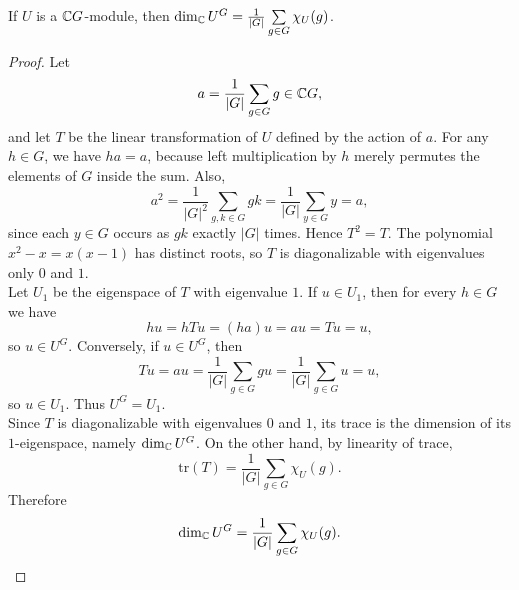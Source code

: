 \documentclass[../Odyssey_Project.tex]{subfiles}
\begin{document}
\begin{lemma}
\label{lem:14.11}
If $U$ is a $\mathbb{C} G$-module, then $\dim_{\mathbb{C}} U^G = \frac{1}{|G|} \sum\limits_{g \in G} \chi_U(g)$.
\end{lemma}
\begin{proof}
    Let
    \[
        a=\frac{1}{|G|}\sum_{g \in G}g \in \mathbb{C} G,
    \]
    and let $T$ be the linear transformation of $U$ defined by the action of $a$. For any $h \in G$, we have $ha=a$, because left multiplication by $h$ merely permutes the elements of $G$ inside the sum. Also,
    \[
        a^2
        =
        \frac{1}{|G|^2}\sum_{g,k \in G}gk
        =
        \frac{1}{|G|}\sum_{y \in G}y
        =
        a,
    \]
    since each $y \in G$ occurs as $gk$ exactly $|G|$ times. Hence $T^2=T$. The polynomial $x^2-x=x(x-1)$ has distinct roots, so $T$ is diagonalizable with eigenvalues only $0$ and $1$.\\
    Let $U_1$ be the eigenspace of $T$ with eigenvalue $1$. If $u \in U_1$, then for every $h \in G$ we have
    \[
        hu=hTu=(ha)u=au=Tu=u,
    \]
    so $u \in U^G$. Conversely, if $u \in U^G$, then
    \[
        Tu=au=\frac{1}{|G|}\sum_{g \in G}gu
        =
        \frac{1}{|G|}\sum_{g \in G}u
        =
        u,
    \]
    so $u \in U_1$. Thus $U^G=U_1$.\\
    Since $T$ is diagonalizable with eigenvalues $0$ and $1$, its trace is the dimension of its $1$-eigenspace, namely $\dim_{\mathbb{C}}U^G$. On the other hand, by linearity of trace,
    \[
        \mathrm{tr}(T)
        =
        \frac{1}{|G|}\sum_{g \in G}\chi_U(g).
    \]
    Therefore
    \[
        \dim_{\mathbb{C}}U^G=\frac{1}{|G|}\sum_{g \in G}\chi_U(g).
    \]
\end{proof}
\end{document}
